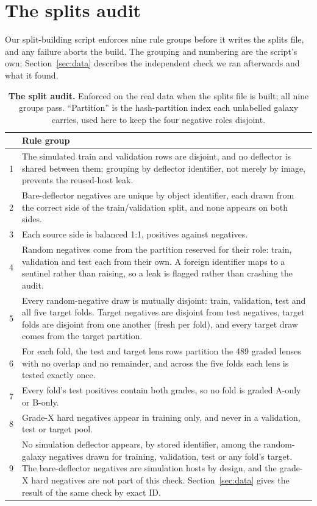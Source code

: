 \section{The splits audit}
\label{sec:splitrules}

Our split-building script enforces nine rule groups before it writes the splits file, and any
failure aborts the build. The grouping and numbering are the script's own;
Section~\ref{sec:data} describes the independent check we ran afterwards and what it found.

\begin{table}[htbp]
\centering
\footnotesize
\setlength{\tabcolsep}{4pt}
\caption{\textbf{The split audit.} Enforced on the real data when the splits file is built;
all nine groups pass. ``Partition'' is the hash-partition index each unlabelled galaxy
carries, used here to keep the four negative roles disjoint.}
\label{tab:splitrules}
\begin{tabular}{rp{}}
\toprule
& Rule group \\
\midrule
1 & The simulated train and validation rows are disjoint, and no deflector is shared
between them; grouping by deflector identifier, not merely by image, prevents the
reused-host leak. \\
2 & Bare-deflector negatives are unique by object identifier, each drawn from the correct
side of the train/validation split, and none appears on both sides. \\
3 & Each source side is balanced 1:1, positives against negatives. \\
4 & Random negatives come from the partition reserved for their role: train, validation
and test each from their own. A foreign identifier maps to a sentinel rather than raising,
so a leak is flagged rather than crashing the audit. \\
5 & Every random-negative draw is mutually disjoint: train, validation, test and all five
target folds. Target negatives are disjoint from test negatives, target folds are
disjoint from one another (fresh per fold), and every
target draw comes from the target partition. \\
6 & For each fold, the test and target lens rows partition the 489 graded lenses
with no overlap and no remainder, and across the five folds each lens is tested exactly
once. \\
7 & Every fold's test positives contain both grades, so no fold is graded A-only or
B-only. \\
8 & Grade-X hard negatives appear in training only, and never in a validation, test or
target pool. \\
9 & No simulation deflector appears, by stored identifier, among the random-galaxy negatives
drawn for training, validation, test or any fold's target. The bare-deflector negatives are
simulation hosts by design, and the grade-X hard negatives are not part of this check.
Section~\ref{sec:data} gives the result of the same check by exact ID. \\
\bottomrule
\end{tabular}
\end{table}

